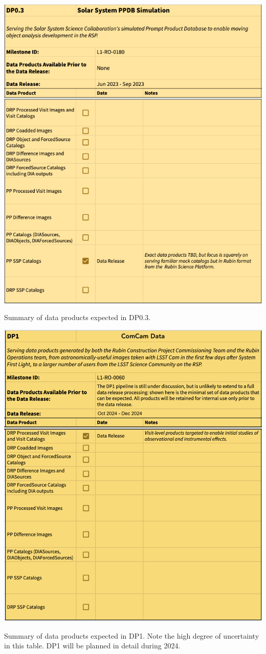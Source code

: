 \begin{table}[ht]
\centering
\includegraphics[width=0.9\linewidth]{figures/DP0_3-products.png}
\caption{Summary of data products expected in DP0.3.}
\label{tab:dp-zero-three-products}
\end{table}

\begin{table}[ht]
\centering
\includegraphics[width=0.9\linewidth]{figures/DP1-products}
\caption{Summary of data products expected in DP1.
Note the high degree of uncertainty in this table. DP1 will be planned in detail during 2024. }
\label{tab:dp-one-products}
\end{table}

